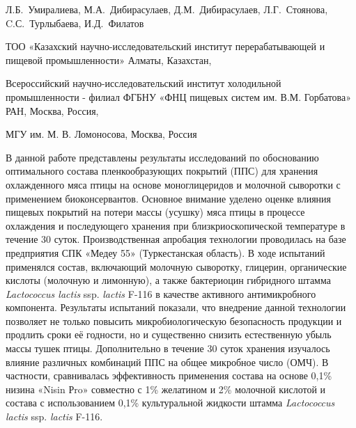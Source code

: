 
\begin{header}

Л.Б.~Умиралиева\envelope,
М.А.~Дибирасулаев,
Д.М.~Дибирасулаев,
Л.Г.~Стоянова,
C.С.~Турлыбаева,
И.Д.~Филатов
\end{header}

\begin{affil}
ТОО «Казахский научно-исследовательский институт перерабатывающей и пищевой промышленности» Алматы, Казахстан,

Всероссийский научно-исследовательский институт холодильной промышленности - филиал ФГБНУ «ФНЦ пищевых систем им. В.М. Горбатова» РАН, Москва, Россия,

МГУ им. М. В. Ломоносова, Москва, Россия

\end{affil}

В данной работе представлены результаты исследований по обоснованию
оптимального состава пленкообразующих покрытий (ППС) для хранения
охлажденного мяса птицы на основе моноглицеридов и молочной сыворотки с
применением биоконсервантов. Основное внимание уделено оценке влияния
пищевых покрытий на потери массы (усушку) мяса птицы в процессе
охлаждения и последующего хранения при близкриоскопической температуре в
течение 30 суток. Производственная апробация технологии проводилась на
базе предприятия СПК «Медеу 55» (Туркестанская область). В ходе
испытаний применялся состав, включающий молочную сыворотку, глицерин,
органические кислоты (молочную и лимонную), а также бактериоцин
гибридного штамма \emph{Lactococcus lactis} ssp. \emph{lactis} F-116 в
качестве активного антимикробного компонента. Результаты испытаний
показали, что внедрение данной технологии позволяет не только повысить
микробиологическую безопасность продукции и продлить сроки её годности,
но и существенно снизить естественную убыль массы тушек птицы.
Дополнительно в течение 30 суток хранения изучалось влияние различных
комбинаций ППС на общее микробное число (ОМЧ). В частности, сравнивалась
эффективность применения состава на основе 0,1\% низина «Nisin Рro»
совместно с 1\% желатином и 2\% молочной кислотой и состава с
использованием 0,1\% культуральной жидкости штамма \emph{Lactococcus
lactis} ssp. \emph{lactis} F-116.

